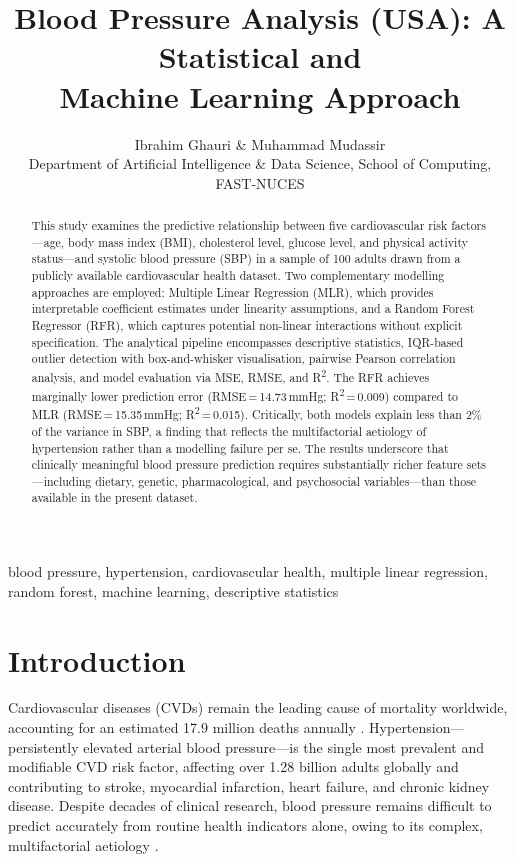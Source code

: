 ﻿\documentclass[conference]{IEEEtran}
\title{Blood Pressure Analysis (USA): A Statistical and\\Machine Learning Approach}
\author{Ibrahim Ghauri \& Muhammad Mudassir\\
Department of Artificial Intelligence \& Data Science, School of Computing, FAST-NUCES\\
}
\begin{document}
\maketitle

\begin{abstract}
This study examines the predictive relationship between five cardiovascular risk factors---age, body mass index (BMI), cholesterol level, glucose level, and physical activity status---and systolic blood pressure (SBP) in a sample of 100 adults drawn from a publicly available cardiovascular health dataset. Two complementary modelling approaches are employed: Multiple Linear Regression (MLR), which provides interpretable coefficient estimates under linearity assumptions, and a Random Forest Regressor (RFR), which captures potential non-linear interactions without explicit specification. The analytical pipeline encompasses descriptive statistics, IQR-based outlier detection with box-and-whisker visualisation, pairwise Pearson correlation analysis, and model evaluation via MSE, RMSE, and R\textsuperscript{2}. The RFR achieves marginally lower prediction error (RMSE\,=\,14.73\,mmHg; R\textsuperscript{2}\,=\,0.009) compared to MLR (RMSE\,=\,15.35\,mmHg; R\textsuperscript{2}\,=\,0.015). Critically, both models explain less than 2\% of the variance in SBP, a finding that reflects the multifactorial aetiology of hypertension rather than a modelling failure per se. The results underscore that clinically meaningful blood pressure prediction requires substantially richer feature sets---including dietary, genetic, pharmacological, and psychosocial variables---than those available in the present dataset.
\end{abstract}

\begin{IEEEkeywords}
blood pressure, hypertension, cardiovascular health, multiple linear regression, random forest, machine learning, descriptive statistics
\end{IEEEkeywords}

\section{Introduction}

Cardiovascular diseases (CVDs) remain the leading cause of mortality worldwide, accounting for an estimated 17.9 million deaths annually \cite{who2021}. Hypertension---persistently elevated arterial blood pressure---is the single most prevalent and modifiable CVD risk factor, affecting over 1.28 billion adults globally and contributing to stroke, myocardial infarction, heart failure, and chronic kidney disease. Despite decades of clinical research, blood pressure remains difficult to predict accurately from routine health indicators alone, owing to its complex, multifactorial aetiology \cite{hpae141}.
\end{document}
